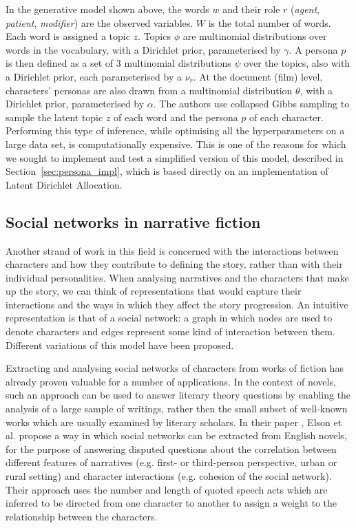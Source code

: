 \documentclass[bsc,frontabs,deptreport,singlespacing,parskip, twoside]{infthesis}
\begin{document}
In the generative model shown above, the words $w$ and their role $r$ (\textit{agent}, \textit{patient}, \textit{modifier}) are the observed variables. $W$ is the total number of words. Each word is assigned a topic $z$. Topics $\phi$ are multinomial distributions over words in the vocabulary, with a Dirichlet prior, parameterised by $\gamma$. A persona $p$ is then defined as a set of 3 multinomial distributions $\psi$ over the topics, also with a Dirichlet prior, each parameterised by a $\nu_r$. At the document (film) level, characters' personas are also drawn from a multinomial distribution $\theta$, with a Dirichlet prior, parameterised by $\alpha$. The authors use collapsed Gibbs sampling \cite{griffiths2004finding} to sample the latent topic $z$ of each word and the persona $p$ of each character. Performing this type of inference, while optimising all the hyperparameters on a large data set, is computationally expensive. This is one of the reasons for which we sought to implement and test a simplified version of this model, described in Section~\ref{sec:persona_impl}, which is based directly on an implementation of Latent Dirichlet Allocation.

\subsection{Social networks in narrative fiction}
Another strand of work in this field is concerned with the interactions between characters and how they contribute to defining the story, rather than with their individual personalities. When analysing narratives and the characters that make up the story, we can think of representations that would capture their interactions and the ways in which they affect the story progression. An intuitive representation is that of a social network: a graph in which nodes are used to denote characters and edges represent some kind of interaction between them. Different variations of this model have been proposed.

Extracting and analysing social networks of characters from works of fiction has already proven valuable for a number of applications. In the context of novels, such an approach can be used to answer literary theory questions by enabling the analysis of a large sample of writings, rather then the small subset of well-known works which are usually examined by literary scholars. In their paper \cite{Elson2010}, Elson et al. propose a way in which social networks can be extracted from English novels, for the purpose of answering disputed questions about the correlation between different features of narratives (e.g. first- or third-person perspective, urban or rural setting) and character interactions (e.g. cohesion of the social network). Their approach uses the number and length of quoted speech acts which are inferred to be directed from one character to another to assign a weight to the relationship between the characters.
\end{document}
